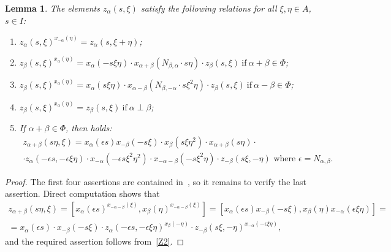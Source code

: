 \documentclass[oneside, 8pt]{amsart}
\newtheorem{lemma}{Lemma}
\theoremstyle{remark}
\theoremstyle{definition}
\numberwithin{equation}{section}
\begin{document}
\begin{lemma}\label{Zrels} The elements $z_\alpha(s, \xi)$ satisfy the following relations for all $\xi, \eta\in A$, $s\in I$:
\begin{enumerate} 
\item\label{Z1} $z_{\alpha}(s, \xi) ^ {x_{-\alpha}(\eta)} = z_{\alpha}(s, \xi + \eta)$;
\item\label{Z2} $z_{\beta}(s, \xi) ^ {x_{\alpha}(\eta)} = x_{\alpha} (- s\xi \eta) \cdot x_{\alpha+\beta} (N_{\beta, \alpha}\cdot s\eta)     \cdot z_{\beta}(s, \xi)\ \text{if}\ \alpha + \beta \in \Phi$;
\item\label{Z3} $z_{\beta}(s, \xi) ^ {x_{\alpha}(\eta)} = x_{\alpha} (s\xi \eta) \cdot x_{\alpha-\beta} (N_{\beta,-\alpha}\cdot s\xi^2\eta) \cdot z_{\beta}(s, \xi)\ \text{if}\ \alpha - \beta \in \Phi$;

\item\label{Z4} $z_{\beta}(s, \xi) ^ {x_{\alpha}(\eta)} = z_{\beta}(s, \xi)\ \text{if}\ \alpha\perp\beta$;
\item\label{Z5} If $\alpha+\beta\in\Phi$, then holds:
\begin{multline} \nonumber z_{\alpha+\beta}(s\eta, \xi) = x_\alpha(\epsilon s) x_{-\beta}(-s\xi) \cdot x_{\beta}(s\xi\eta^2) \cdot x_{\alpha+\beta}(s \eta) \cdot \\ \cdot z_\alpha(-\epsilon s, -\epsilon \xi\eta) \cdot
  x_{-\alpha}(-\epsilon s\xi^2\eta^2) \cdot x_{-\alpha-\beta}(- s \xi^2 \eta) \cdot z_{-\beta}(s\xi, -\eta)\text{ where $\epsilon = N_{\alpha,\beta}$.}\end{multline}
\end{enumerate} \end{lemma}
\begin{proof}
The first four assertions are contained in~\cite[Lemma~9]{S15}, so it remains to verify the last assertion.
Direct computation shows that
\begin{multline} \nonumber
  z_{\alpha+\beta}(s\eta, \xi) = [x_\alpha(\epsilon s)^{x_{-\alpha-\beta}(\xi)}, x_\beta(\eta)^{x_{-\alpha-\beta}(\xi)}] =
  [x_\alpha(\epsilon s) x_{-\beta}(-s\xi), x_{\beta}(\eta) x_{-\alpha}(\epsilon \xi\eta)] = \\ 
  = x_\alpha(\epsilon s) \cdot x_{-\beta}(-s\xi) \cdot z_\alpha(-\epsilon s, -\epsilon \xi\eta)^{x_{\beta}(-\eta)} \cdot z_{-\beta}(s\xi, -\eta)^{x_{-\alpha}(-\epsilon \xi\eta)},
\end{multline} 
and the required assertion follows from~\eqref{Z2}.
\end{proof}
\end{document}

